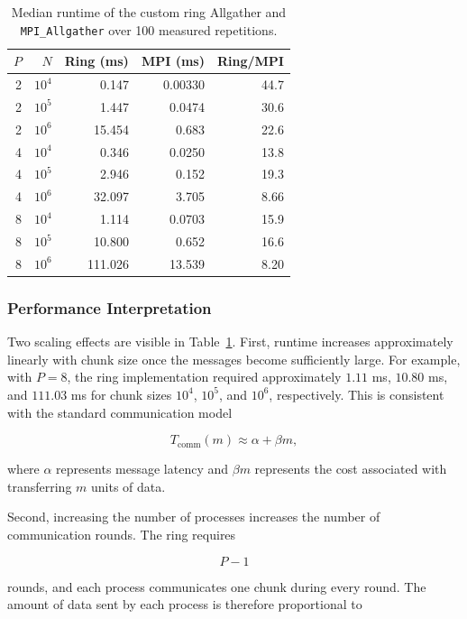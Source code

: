 \begin{table}[ht]
	\centering
	\begin{tabular}{rrrrr}
		\toprule
		$P$ & $N$ & Ring (ms) & MPI (ms) & Ring/MPI \\
		\midrule
		2 & $10^4$ & 0.147 & 0.00330 & 44.7 \\
		2 & $10^5$ & 1.447 & 0.0474  & 30.6 \\
		2 & $10^6$ & 15.454 & 0.683  & 22.6 \\
		\midrule
		4 & $10^4$ & 0.346 & 0.0250 & 13.8 \\
		4 & $10^5$ & 2.946 & 0.152  & 19.3 \\
		4 & $10^6$ & 32.097 & 3.705  & 8.66 \\
		\midrule
		8 & $10^4$ & 1.114 & 0.0703 & 15.9 \\
		8 & $10^5$ & 10.800 & 0.652 & 16.6 \\
		8 & $10^6$ & 111.026 & 13.539 & 8.20 \\
		\bottomrule
	\end{tabular}
	\caption{Median runtime of the custom ring Allgather and
		\texttt{MPI\_Allgather} over 100 measured repetitions.}
	\label{tab:ring-allgather}
\end{table}

\subsubsection{Performance Interpretation}

Two scaling effects are visible in Table~\ref{tab:ring-allgather}.
First, runtime increases approximately linearly with chunk size once
the messages become sufficiently large. For example, with $P=8$, the
ring implementation required approximately $1.11$ ms, $10.80$ ms, and
$111.03$ ms for chunk sizes $10^4$, $10^5$, and $10^6$, respectively.
This is consistent with the standard communication model

$$
T_{\mathrm{comm}}(m)
\approx
\alpha+\beta m,
$$

where $\alpha$ represents message latency and $\beta m$ represents the
cost associated with transferring $m$ units of data.

Second, increasing the number of processes increases the number of
communication rounds. The ring requires

$$
P-1
$$

rounds, and each process communicates one chunk during every round.
The amount of data sent by each process is therefore proportional to

